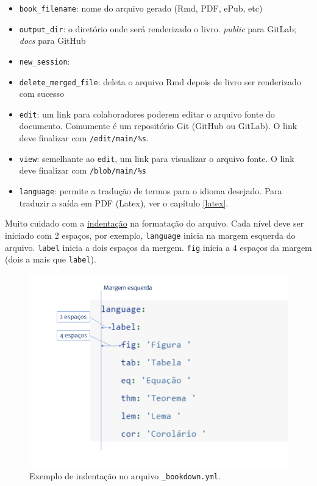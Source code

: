 \documentclass[
]{book}
\begin{document}
\begin{itemize}
\item
  \texttt{book\_filename}: nome do arquivo gerado (Rmd, PDF, ePub, etc)
\item
  \texttt{output\_dir}: o diretório onde será renderizado o livro. \emph{public} para GitLab; \emph{docs} para GitHub
\item
  \texttt{new\_session}:
\item
  \texttt{delete\_merged\_file}: deleta o arquivo Rmd depois de livro ser renderizado com sucesso
\item
  \texttt{edit}: um link para colaboradores poderem editar o arquivo fonte do documento. Comumente é um repositório Git (GitHub ou GitLab). O link deve finalizar com \texttt{/edit/main/\%s}.
\item
  \texttt{view}: semelhante ao \texttt{edit}, um link para visualizar o arquivo fonte. O link deve finalizar com \texttt{/blob/main/\%s}
\item
  \texttt{language}: permite a tradução de termos para o idioma desejado. Para traduzir a saída em PDF (Latex), ver o capítulo \ref{latex}.
\end{itemize}

Muito cuidado com a \href{https://pt.wikipedia.org/wiki/Indenta\%C3\%A7\%C3\%A3o}{indentação} na formatação do arquivo. Cada nível deve ser iniciado com 2 espaços, por exemplo, \texttt{language} inicia na margem esquerda do arquivo. \texttt{label} inicia a dois espaços da mergem. \texttt{fig} inicia a 4 espaços da margem (dois a mais que \texttt{label}).



\begin{figure}
\includegraphics[width=400pt]{image/indent-bookdown} \caption{Exemplo de indentação no arquivo \texttt{\_bookdown.yml}.}\label{fig:ident-bookdown}
\end{figure}
\end{document}
